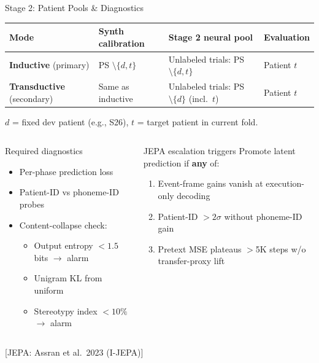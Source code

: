 \documentclass[aspectratio=169, 11pt]{beamer}
\newcommand{\emphcite}[1]{\textcolor{DukeBlue!70}{\footnotesize [#1]}}
\begin{document}

\begin{frame}{Stage 2: Patient Pools \& Diagnostics}

\centering
\small
\renewcommand{\arraystretch}{1.15}
\begin{tabular}{@{}l L{3.4cm} L{4.2cm} L{2.5cm}@{}}
  \toprule
  \textbf{Mode} & \textbf{Synth calibration} & \textbf{Stage 2 neural pool} & \textbf{Evaluation} \\
  \midrule
  \textbf{Inductive} (primary) & PS $\setminus \{d, t\}$ & Unlabeled trials: PS $\setminus \{d, t\}$ & Patient $t$ \\
  \textbf{Transductive} (secondary) & Same as inductive & Unlabeled trials: PS $\setminus \{d\}$ (incl.\ $t$) & Patient $t$ \\
  \bottomrule
\end{tabular}

\vspace{0.3em}
{\footnotesize $d$ = fixed dev patient (e.g., S26), $t$ = target patient in current fold.}

\vspace{0.8em}

\begin{columns}[T]
\begin{column}{0.48\textwidth}
\begin{block}{\small Required diagnostics}
\small
\begin{itemize}
  \item Per-phase prediction loss
  \item Patient-ID vs phoneme-ID probes
  \item Content-collapse check:
    \begin{itemize}\scriptsize
      \item Output entropy $< 1.5$ bits $\to$ alarm
      \item Unigram KL from uniform
      \item Stereotypy index $< 10\%$ $\to$ alarm
    \end{itemize}
\end{itemize}
\end{block}
\end{column}
\begin{column}{0.48\textwidth}
\begin{block}{\small JEPA escalation triggers}
\small
Promote latent prediction if \textbf{any} of:
\begin{enumerate}\small
  \item Event-frame gains vanish at execution-only decoding
  \item Patient-ID $> 2\sigma$ without phoneme-ID gain
  \item Pretext MSE plateaus $>$5K steps w/o transfer-proxy lift
\end{enumerate}
\end{block}
\end{column}
\end{columns}

\emphcite{JEPA: Assran et al.\ 2023 (I-JEPA)}
\end{frame}
\end{document}
